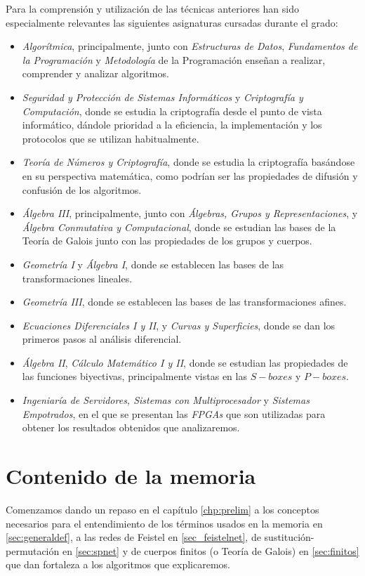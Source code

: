 Para la comprensión y utilización de las técnicas anteriores han sido especialmente relevantes las siguientes asignaturas cursadas durante el grado:
\begin{itemize}
	\item \textit{Algorítmica}, principalmente, junto con \textit{Estructuras de Datos}, \textit{Fundamentos de la Programación} y \textit{Metodología} de la Programación enseñan a realizar, comprender y analizar algoritmos.
	\item \textit{Seguridad y Protección de Sistemas Informáticos} y \textit{Criptografía y Computación}, donde se estudia la criptografía desde el punto de vista informático, dándole prioridad a la eficiencia, la implementación y los protocolos que se utilizan habitualmente.
	\item \textit{Teoría de Números y Criptografía}, donde se estudia la criptografía basándose en su perspectiva matemática, como podrían ser las propiedades de difusión y confusión de los algoritmos.
	\item \textit{Álgebra III}, principalmente, junto con \textit{Álgebras, Grupos y Representaciones}, y \textit{Álgebra Conmutativa y Computacional}, donde se estudian las bases de la Teoría de Galois junto con las propiedades de los grupos y cuerpos.
	\item \textit{Geometría I} y \textit{Álgebra I}, donde se establecen las bases de las transformaciones lineales.
	\item \textit{Geometría III}, donde se establecen las bases de las transformaciones afines.
	\item \textit{Ecuaciones Diferenciales I y II}, y \textit{Curvas y Superficies}, donde se dan los primeros pasos al análisis diferencial.
	\item \textit{Álgebra II}, \textit{Cálculo Matemático I y II}, donde se estudian las propiedades de las funciones biyectivas, principalmente vistas en las $S-boxes$ y $P-boxes$.
	\item \textit{Ingeniaría de Servidores, Sistemas con Multiprocesador} y \textit{Sistemas Empotrados}, en el que se presentan las \textit{FPGAs} que son utilizadas para obtener los resultados obtenidos que analizaremos.
\end{itemize}

\section{Contenido de la memoria}
Comenzamos dando un repaso en el capítulo \ref{chp:prelim} a los conceptos necesarios para el entendimiento de los términos usados en la memoria en \ref{sec:generaldef}, a las redes de Feistel en \ref{sec_feistelnet}, de sustitución-permutación en \ref{sec:spnet} y de cuerpos finitos (o Teoría de Galois) en \ref{sec:finitos} que dan fortaleza a los algoritmos que explicaremos.

